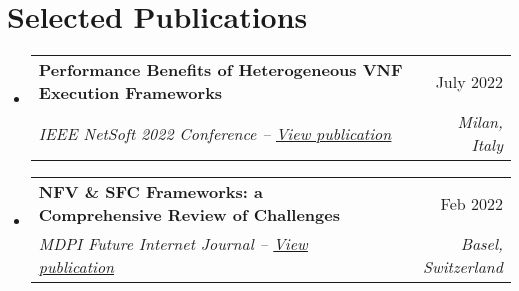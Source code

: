 \documentclass[letterpaper,11pt]{article}
\makeatletter
\newcommand{\resumeSubheading}[4]{
  \vspace{-2pt}\item
    \begin{tabular*}{0.97\textwidth}[t]{l@{\extracolsep{\fill}}r}
      \textbf{#1} & #2 \\
      \textit{\small#3} & \textit{\small #4} \\
    \end{tabular*}\vspace{-7pt}
}
\newcommand{\resumeSubHeadingListStart}{\begin{itemize}[leftmargin=0.15in, label={}]}
\newcommand{\resumeSubHeadingListEnd}{\end{itemize}}
\newcommand{\resumeItemListStart}{\begin{itemize}}
\newcommand{\resumeItemListEnd}{\end{itemize}\vspace{-5pt}}
\makeatother
\begin{document}
\section{\textbf{Selected Publications}}
  \resumeSubHeadingListStart

    \resumeSubheading
      {Performance Benefits of Heterogeneous VNF Execution Frameworks}{July 2022}
      {IEEE NetSoft 2022 Conference --     \href{https://eprints.gla.ac.uk/270458/}{\underline{View publication}}}{Milan, Italy}
   
   
    \resumeSubheading
      {NFV \& SFC Frameworks: a Comprehensive Review of Challenges}{Feb 2022}
      {MDPI Future Internet Journal --     \href{https://www.mdpi.com/1999-5903/14/2/59}{\underline{View publication}}}{Basel, Switzerland}
      \resumeItemListStart
     
      \resumeItemListEnd
      
     
    \resumeSubHeadingListEnd



\end{document}
